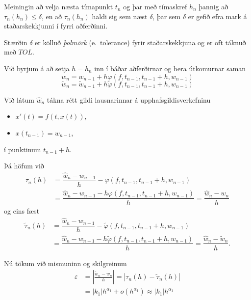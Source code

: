 \documentclass[icelandic,a4paper,12pt]{article}
\begin{document}
\pause
\smallskip
Meiningin að velja næsta tímapunkt $t_n$ og þar með tímaskref $h_n$
þannig að $\tau_n(h_n)\leq \delta$, en að $\tau_n(h_n)$ haldi sig
sem næst $\delta$, þar sem $\delta $ er gefið  efra mark á
staðarskekkjunni í fyrri aðferðinni.  

\pause
\smallskip
Stærðin $\delta$ er  kölluð 
{\it  þolmörk} (e.~tolerance) fyrir staðarskekkjuna 
og er oft táknuð með $TOL$.



Við byrjum á að setja $h=h_{n}$ inn í báðar
aðferðirnar og bera útkomurnar  saman
  \[ w_{n} = w_{n-1} + h\varphi(f,t_{n-1},t_{n-1}+h,w_{n-1}) \]
  \[ \tilde w_{n} = \tilde w_{n-1} + 
h\tilde\varphi(f,t_{n-1},t_{n-1}+h,w_{n-1}) \]  

\pause
\smallskip
Við látum $\hat w_{n}$ tákna rétt gildi lausnarinnar á
upphafsgildisverkefninu 
\begin{itemize}
 \item $x'(t)=f(t,x(t))$, 
 \item $x(t_{n-1})=w_{n-1}$,
\end{itemize}
í punktinum $t_{n-1}+h$.



Þá höfum við 
\begin{align*}
 \tau_n(h)&=\dfrac{\hat
w_{n}-w_{n-1}}{h}-\varphi(f,t_{n-1},t_{n-1}+h,w_{n-1})\\
&=\dfrac{\hat
w_{n}-w_{n-1}-h\varphi(f,t_{n-1},t_{n-1}+h,w_{n-1})}{h} 
=\dfrac {\hat w_{n}-w_{n}}{h}
\end{align*}
og eins fæst
\begin{align*}
\tilde \tau_n(h)
&=\dfrac{\hat
w_{n}-w_{n-1}}{h}-\tilde \varphi(f,t_{n-1},t_{n-1}+h,w_{n-1})\\
&=\dfrac{\hat
w_{n}-w_{n-1}-h\tilde \varphi(f,t_{n-1},t_{n-1}+h,w_{n-1})}{h} 
=\dfrac {\hat w_{n}-\tilde w_{n}}{h}. 
\end{align*}



Nú tökum við mismuninn og skilgreinum
\begin{align*}
\varepsilon 
&= \left|\frac{\tilde w_{n}-w_{n}}{h}\right|=|\tau_n(h)-\tilde
  \tau_n(h)|\\
&=|k_1|h^{\alpha_1}+o(h^{\alpha_1}) \approx |k_1|h^{\alpha_1}  
\end{align*}
\end{document}
